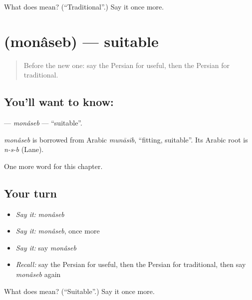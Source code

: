 \begin{tcolorbox}[breakable,colback=teal!4,colframe=teal!35!black,title={Before you move on}]
What does  mean? (\textquotedblleft{}Traditional\textquotedblright{}.) Say it once more.
\end{tcolorbox}
\section[\texorpdfstring{\fa{مناسب} (monâseb)}{مناسب (monâseb)}]{ (monâseb) — suitable}

\label{lesson:FA-C273-monaseb}



\begin{quote}
Before the new one: say the Persian for useful, then the Persian for traditional.
\end{quote}

\subsection*{You'll want to know: }
\textbf{} — \emph{monâseb} — \textquotedblleft{}suitable\textquotedblright{}.

\begin{cousinweb}
\emph{monâseb} is borrowed from Arabic \emph{munāsib}, \textquotedblleft{}fitting, suitable\textquotedblright{}. Its Arabic root is \emph{n-s-b} (Lane).
\end{cousinweb}

\begin{grammarlens}[title={What you've built}]
One more word for this chapter.
\end{grammarlens}

\subsection*{Your turn}
\begin{itemize}
\raggedright
  \item \emph{Say it:} \emph{monâseb}
  \item \emph{Say it:} \emph{monâseb}, once more
  \item \emph{Say it:} say \emph{monâseb}
  \item \emph{Recall:} say the Persian for useful, then the Persian for traditional, then say \emph{monâseb} again
\end{itemize}

\begin{tcolorbox}[breakable,colback=teal!4,colframe=teal!35!black,title={Before you move on}]
What does  mean? (\textquotedblleft{}Suitable\textquotedblright{}.) Say it once more.
\end{tcolorbox}
